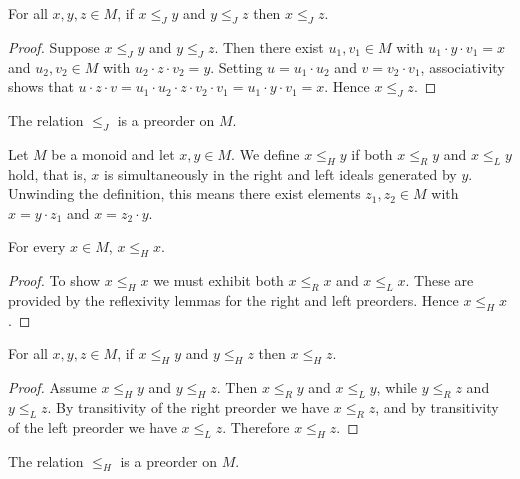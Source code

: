 \begin{lemma}[Transitivity of \(\le_J\)]
\label{lem:JRel-trans}
For all \(x,y,z\in M\), if \(x \le_J y\) and \(y \le_J z\) then \(x \le_J z\).
\leanok
{}
\end{lemma}
\begin{proof}
\leanok
Suppose \(x \le_J y\) and \(y \le_J z\).  Then there exist \(u_1,v_1\in M\) with \(u_1\cdot y\cdot v_1 = x\) and \(u_2,v_2\in M\) with \(u_2\cdot z\cdot v_2 = y\).  Setting \(u = u_1\cdot u_2\) and \(v = v_2\cdot v_1\), associativity shows that \(u\cdot z\cdot v = u_1\cdot u_2\cdot z\cdot v_2\cdot v_1 = u_1\cdot y\cdot v_1 = x\).  Hence \(x \le_J z\).
\end{proof}

\begin{lemma}
\label{lem:JRel-isPreorder}
The relation \(\le_J\) is a preorder on \(M\).
\leanok
{}
\end{lemma}

\begin{definition}
\label{def:HRel}
Let \(M\) be a monoid and let \(x,y\in M\).  We define
\(x \le_H y\) if both \(x \le_R y\) and \(x \le_L y\) hold, that is,
\(x\) is simultaneously in the right and left ideals generated by \(y\).
Unwinding the definition, this means there exist elements \(z_1,z_2\in M\)
with \(x = y\cdot z_1\) and \(x = z_2\cdot y\).
\leanok
\end{definition}
\begin{lemma}[Reflexivity of \(\le_H\)]
\label{lem:HRel-refl}
For every \(x\in M\), \(x \le_H x\).
\leanok
{}
\end{lemma}
\begin{proof}
\leanok
To show \(x \le_H x\) we must exhibit both \(x \le_R x\) and \(x \le_L x\).  These are provided by the reflexivity lemmas for the right and left preorders.  Hence \(x \le_H x\).
\end{proof}

\begin{lemma}[Transitivity of \(\le_H\)]
\label{lem:HRel-trans}
For all \(x,y,z\in M\), if \(x \le_H y\) and \(y \le_H z\) then \(x \le_H z\).
\leanok
{}
\end{lemma}
\begin{proof}
\leanok
Assume \(x \le_H y\) and \(y \le_H z\).  Then \(x \le_R y\) and \(x \le_L y\), while \(y \le_R z\) and \(y \le_L z\).  By transitivity of the right preorder we have \(x \le_R z\), and by transitivity of the left preorder we have \(x \le_L z\).  Therefore \(x \le_H z\).
\end{proof}

\begin{lemma}
\label{lem:HRel-isPreorder}
The relation \(\le_H\) is a preorder on \(M\).
\leanok
{}
\end{lemma}
